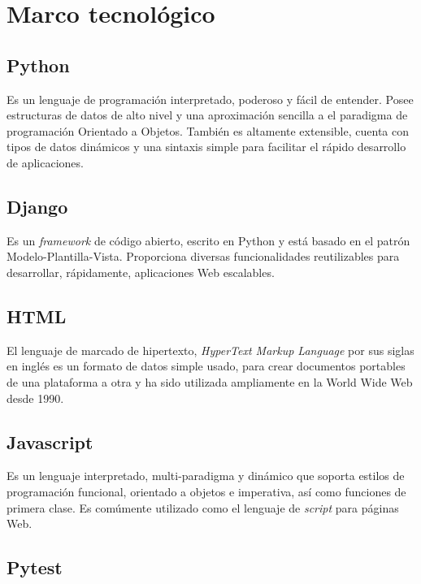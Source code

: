 \chapter{\textbf{Marco tecnológico}}
\thispagestyle{empty}

\section{Python}

Es un lenguaje de programación interpretado, poderoso y fácil de entender. Posee estructuras de datos de alto nivel y una aproximación sencilla a el paradigma de programación Orientado a Objetos. También es altamente extensible, cuenta con tipos de datos dinámicos y una sintaxis simple para facilitar el rápido desarrollo de aplicaciones. \citep{Python_tutorial}

\section{Django}

Es un \textit{framework} de código abierto, escrito en Python y está basado en el patrón Modelo-Plantilla-Vista. Proporciona diversas funcionalidades reutilizables para desarrollar, rápidamente, aplicaciones Web escalables. 

\section{HTML}

El lenguaje de marcado de hipertexto, \textit{HyperText Markup Language} por sus siglas en inglés es un formato de datos simple usado, para crear documentos portables de una plataforma a otra y ha sido utilizada ampliamente en la World Wide Web desde 1990. \citep{RFC1866}

\section{Javascript}

Es un lenguaje interpretado, multi-paradigma y dinámico que soporta estilos de programación funcional,  orientado a objetos e imperativa, así como funciones de primera clase. Es comúmente utilizado como el lenguaje de \textit{script} para páginas Web. \citep{javascript}

\section{Pytest}

